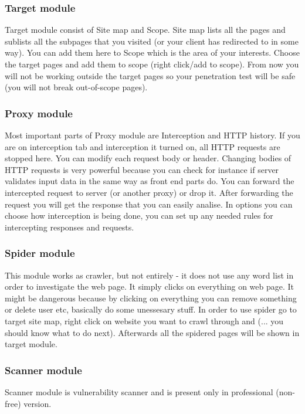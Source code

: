 \documentclass{article}[12pt]
\begin{document}
\subsubsection{Target module}
Target module consist of Site map and Scope.
Site map lists all the pages and sublists all the subpages that you visited (or your client has redirected to in some way).
You can add them here to Scope which is the area of your interests.
Choose the target pages and add them to scope (right click/add to scope).
From now you will not be working outside the target pages so your penetration test will be safe (you will not break out-of-scope pages).

\subsubsection{Proxy module}
Most important parts of Proxy module are Interception and HTTP history.
If you are on interception tab and interception it turned on, all HTTP requests are stopped here.
You can modify each request body or header.
Changing bodies of HTTP requests is very powerful because you can check for instance if server validates input data in the same way as front end parts do.
You can forward the intercepted request to server (or another proxy) or drop it.
After forwarding the request you will get the response that you can easily analise.
In options you can choose how interception is being done, you can set up any needed rules for intercepting responses and requests.

\subsubsection{Spider module}
This module works as crawler, but not entirely - it does not use any word list in order to investigate the web page.
It simply clicks on everything on web page.
It might be dangerous because by clicking on everything you can remove something or delete user etc, basically do some unessesary stuff.
In order to use spider go to target site map, right click on website you want to crawl through and (... you should know what to do next).
Afterwards all the spidered pages will be shown in target module.


\subsubsection{Scanner module}

Scanner module is vulnerability scanner and is present only in professional (non-free) version.
\end{document}
